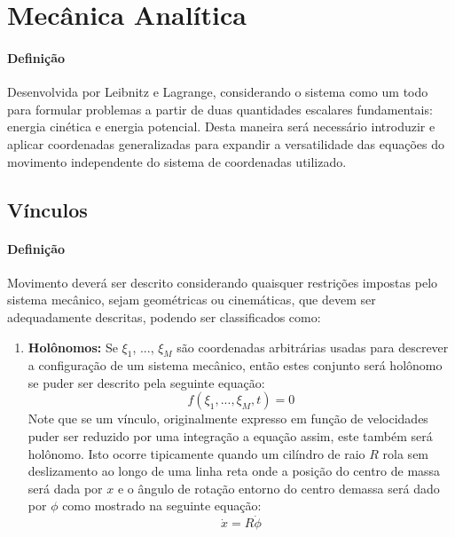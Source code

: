 \documentclass{article}
\begin{document}
    \section{Mecânica Analítica}
        \paragraph{Definição}Desenvolvida por Leibnitz e Lagrange, considerando o sistema como um todo para formular problemas a partir de duas quantidades escalares fundamentais: energia cinética e energia potencial. Desta maneira será necessário introduzir e aplicar coordenadas generalizadas para expandir a versatilidade das equações do movimento independente do sistema de coordenadas utilizado.

        \subsection{Vínculos}
            \paragraph{Definição}Movimento deverá ser descrito considerando quaisquer restrições impostas pelo sistema mecânico, sejam geométricas ou cinemáticas, que devem ser adequadamente descritas, podendo ser classificados como:
                \begin{enumerate}[rightmargin = \leftmargin]
                    \item \textbf{Holônomos:} Se $\xi_{1}$, ..., $\xi_{M}$ são coordenadas arbitrárias usadas para descrever a configuração de um sistema mecânico, então estes conjunto será holônomo se puder ser descrito pela seguinte equação:
                        \begin{equation}
                            \boxed{
                                f(\xi_{1}, ..., \xi_{M}, t) = 0
                            }
                        \end{equation}
                    Note que se um vínculo, originalmente expresso em função de velocidades puder ser reduzido por uma integração a equação assim, este também será holônomo. Isto ocorre tipicamente quando um cilíndro de raio $R$ rola sem deslizamento ao longo de uma linha reta onde a posição do centro de massa será dada por $x$ e o ângulo de rotação entorno do centro demassa será dado por $\phi$ como mostrado na seguinte equação:
                        \begin{equation}
                            \boxed{
                                \dot{x} = R \dot{\phi}
                            }
                        \end{equation}
                \end{enumerate}
\end{document}
